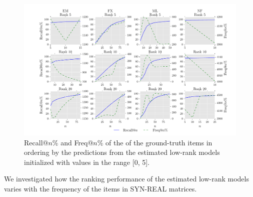 \begin{figure}[bt]
  \hspace*{-1.5cm}
  \includegraphics[scale=0.5]{figures/gtLarge_rank_freq} 
  \caption{Recall@$n$\%  and Freq@$n$\% of the \topf of the ground-truth items 
    in ordering by the predictions from the estimated low-rank models initialized with values in the range [0, 5].}
  \label{fig:flixmlgtfreq_Large}
\end{figure}



We investigated how the ranking performance of the estimated low-rank models varies with
the frequency of the items in SYN-REAL matrices.

